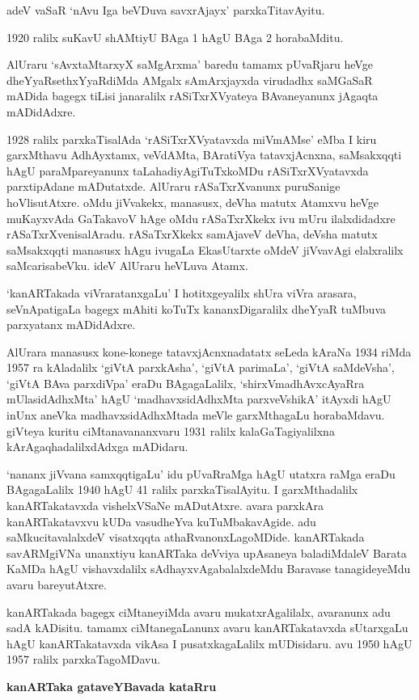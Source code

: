 \documentclass[11pt,a4size]{article}
\begin{document}
adeV vaSaR `nAvu Iga beVDuva savxrAjayx' parxkaTitavAyitu.

1920 ralilx suKavU shAMtiyU BAga 1 hAgU BAga 2 horabaMditu.

AlUraru `sAvxtaMtarxyX saMgArxma' baredu tamamx pUvaRjaru heVge
dheYyaRsethxYyaRdiMda AMgalx sAmArxjayxda virudadhx saMGaSaR mADida
bagegx tiLisi janaralilx rASiTxrXVyateya BAvaneyanunx jAgaqta
mADidAdxre.

1928 ralilx parxkaTisalAda `rASiTxrXVyatavxda miVmAMse' eMba I kiru
garxMthavu AdhAyxtamx, veVdAMta, BAratiVya tatavxjAcnxna, saMsakxqqti
hAgU paraMpareyanunx taLahadiyAgiTuTxkoMDu rASiTxrXVyatavxda
parxtipAdane mADutatxde. AlUraru rASaTxrXvanunx puruSanige
hoVlisutAtxre. oMdu jiVvakekx, manasusx, deVha matutx Atamxvu heVge
muKayxvAda GaTakavoV hAge oMdu rASaTxrXkekx ivu mUru ilalxdidadxre
rASaTxrXvenisalAradu. rASaTxrXkekx samAjaveV deVha, deVsha matutx
saMsakxqqti manasusx hAgu ivugaLa EkasUtarxte oMdeV jiVvavAgi
elalxralilx saMcarisabeVku. ideV AlUraru heVLuva Atamx.

`kanARTakada viVraratanxgaLu' I hotitxgeyalilx shUra viVra arasara,
seVnApatigaLa bagegx mAhiti koTuTx kananxDigaralilx dheYyaR tuMbuva
parxyatanx mADidAdxre.

AlUrara manasusx kone-konege tatavxjAcnxnadatatx seLeda kAraNa 1934
riMda 1957 ra kAladalilx `giVtA parxkAsha', `giVtA parimaLa', `giVtA
saMdeVsha', `giVtA BAva parxdiVpa' eraDu BAgagaLalilx,
`shirxVmadhAvxcAyaRra mUlasidAdhxMta' hAgU `madhavxsidAdhxMta
parxveVshikA' itAyxdi hAgU inUnx aneVka madhavxsidAdhxMtada meVle
garxMthagaLu horabaMdavu. giVteya kuritu ciMtanavananxvaru 1931 ralilx
kalaGaTagiyalilxna kArAgaqhadalilxdAdxga mADidaru.

`nananx jiVvana samxqqtigaLu' idu pUvaRraMga hAgU utatxra raMga eraDu
BAgagaLalilx 1940 hAgU 41 ralilx parxkaTisalAyitu. I garxMthadalilx
kanARTakatavxda vishelxVSaNe mADutAtxre. avara parxkAra
kanARTakatavxvu kUDa vasu\-dheYva kuTuMbakavAgide. adu
saMkucitavalalxdeV visatxqqta athaRvanonxLagoMDide. kanARTakada
savARMgiVNa unanxtiyu kanARTaka deVviya upAsaneya baladiMdaleV Barata
KaMDa hAgU vishavxdalilx sAdhayxvAgabalalxdeMdu Baravase tanagideyeMdu
avaru bareyutAtxre.

kanARTakada bagegx ciMtaneyiMda avaru mukatxrAgalilalx, avaranunx adu
sadA kADisitu. tamamx ciMtanegaLanunx avaru kanARTakatavxda sUtarxgaLu
hAgU kanARTakatavxda vikAsa I pusatxkagaLalilx mUDisidaru. avu 1950
hAgU 1957 ralilx parxkaTagoMDavu.

\bigskip
\centerline{\textbf{\Large{kanARTaka gataveYBavada kataRru}}}
\medskip
\end{document}

